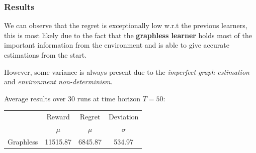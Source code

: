
\begin{frame}

\frametitle{Results}

We can observe that the regret is exceptionally low w.r.t the previous learners, this is most likely due to the fact that the \textbf{graphless learner} holds most of the important information from the environment and is able to give accurate estimations from the start.

However, some variance is always present due to the \textit{imperfect graph estimation} and \textit{environment non-determinism}.

Average results over 30 runs at time horizon $T = 50$:

\begin{table}
	\begin{tabular}{|c|cc|c|}
	\hline \hline
		\cellcolor{blue!25} & Reward 	& Regret	& Deviation \\
	\cline{2-4}
		\cellcolor{blue!25} & $\mu$		& $\mu$		& $\sigma$	\\
	\hline \hline
		Graphless			& 11515.87 	& 6845.87	& 534.97 	\\
	\hline \hline
	\end{tabular}
\end{table}

\end{frame}

